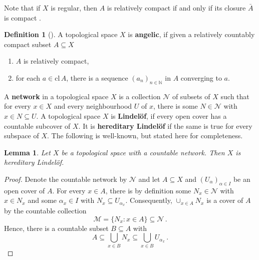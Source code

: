 \documentclass[
	paper=A4,
	pagesize=auto,
	fontsize=12pt
]{scrartcl}
\theoremstyle{plain}
\newtheorem{lemma}[theorem]{Lemma}
\theoremstyle{remark}
\theoremstyle{definition}
\newtheorem{definition}[theorem]{Definition}
\begin{document}
%
Note that if $X$ is regular, then $A$ is relatively compact if and only if its closure $\bar{A}$ is compact \cite[Proposition 17.15]{src:Schlechter:HandbookOfAnalysis}.
%
\begin{definition}[{\cite{src:KönigKuhn:AngelicSpaces}}]
\label{def:angelicity}
A topological space $X$ is \textbf{angelic}, if given a relatively countably compact subset $A \subseteq X$
%
\begin{enumerate}
\item\label{def:angelicity:RelativeCompactnessEquivalence} $A$ is relatively compact,
\item for each $a \in \mathrm{cl}\, A$, there is a sequence $(a_n)_{n \in \mathbb{N}}$ in $A$ converging to $a$.
\end{enumerate} 
\end{definition}
%
A \textbf{network} in a topological space $X$ is a collection $\mathcal{N}$ of subsets of $X$ such that for every $x \in X$ and every neighbourhood $U$ of $x$, there is some $N \in \mathcal{N}$ with $x \in N \subseteq U$.
A topological space $X$ is \textbf{Lindelöf}, if every open cover has a countable subcover of $X$.
It is \textbf{hereditary Lindelöf} if the same is true for every subspace of $X$.
The following  is well-known, but stated here for completeness.
%
\begin{lemma}
\label{lem:CountableNetworkImpliesHereditaryLindelöf}
Let $X$ be a topological space with a countable network.
Then $X$ is hereditary Lindelöf.
\end{lemma}
\begin{proof}
Denote the countable network by $\mathcal{N}$ and let $A \subseteq X$ and $(U_\alpha)_{\alpha \in I}$ be an open cover of $A$.
For every $x \in A$, there is by definition some $N_x \in \mathcal{N}$ with $x \in N_x$ and some $\alpha_x \in I$ with $N_x \subseteq U_{\alpha_x}$.
Consequently, $\cup_{x \in A} N_x$ is a cover of $A$ by the countable collection
%
\begin{equation}
\mathcal{M} = \{ N_x : x \in A \} \subseteq \mathcal{N} \, .
\end{equation}
%
Hence, there is a countable subset $B \subseteq A$ with
%
\begin{equation}
A \subseteq \bigcup_{x \in B} N_x \subseteq \bigcup_{x \in B} U_{\alpha_x} \, .
\end{equation}
\end{proof}
\end{document}
